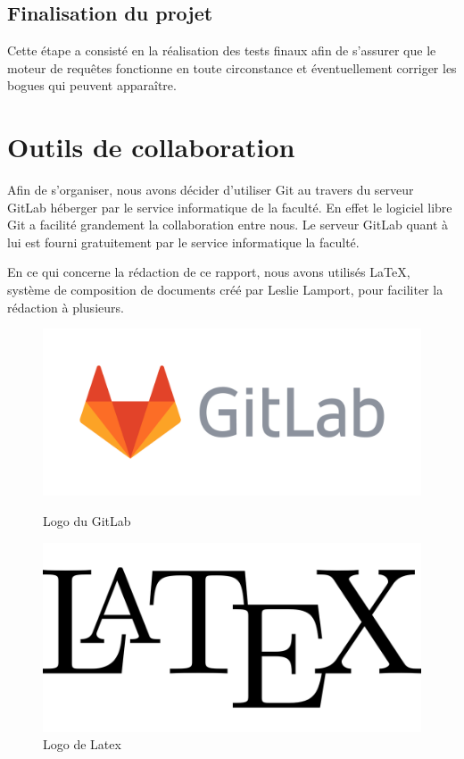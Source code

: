 \documentclass[oneside,13pt,a4paper]{report}
\begin{document}
\subsection{Finalisation du projet}

Cette étape a consisté en la réalisation des tests finaux afin de s’assurer que le moteur de requêtes fonctionne en toute circonstance et éventuellement corriger les bogues qui peuvent apparaître.

\section{Outils de collaboration}

Afin de s’organiser, nous avons décider d’utiliser Git au travers du serveur GitLab héberger par le service informatique de la faculté. En effet le logiciel libre Git a facilité grandement la collaboration entre nous. Le serveur GitLab quant à lui est fourni gratuitement par le service informatique la faculté.

En ce qui concerne la rédaction de ce rapport, nous avons utilisés \LaTeX, système de composition de documents créé par Leslie Lamport, pour faciliter la rédaction à plusieurs.

\begin{figure}[h]
		\begin{minipage}[c]{.46\linewidth}
			\centering
			\includegraphics[width=1\textwidth]{img/gitlab.png}
			\caption{Logo du GitLab}
		\end{minipage}
		\hfill%
		\begin{minipage}[c]{.46\linewidth}
			\centering
			\includegraphics[width=1\textwidth]{img/latex.png}
			\caption{Logo de Latex}
		\end{minipage}
	\end{figure}
\end{document}
